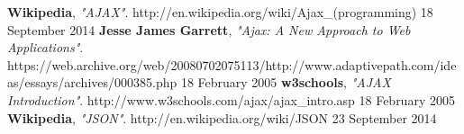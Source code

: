 \begin{thebibliography}{99}

   \textbf{Wikipedia},
   \emph{"AJAX"}.
   http://en.wikipedia.org/wiki/Ajax\_(programming)
   18 September 2014 
   \textbf{Jesse James Garrett},
   \emph{"Ajax: A New Approach to Web Applications"}.
   https://web.archive.org/web/20080702075113/http://www.adaptivepath.com/ideas/essays/archives/000385.php
   18 February 2005
   \textbf{w3schools},
   \emph{"AJAX Introduction"}.
   http://www.w3schools.com/ajax/ajax\_intro.asp
   18 February 2005
   \textbf{Wikipedia},
   \emph{"JSON"}.
   http://en.wikipedia.org/wiki/JSON
   23 September 2014

\end{thebibliography}